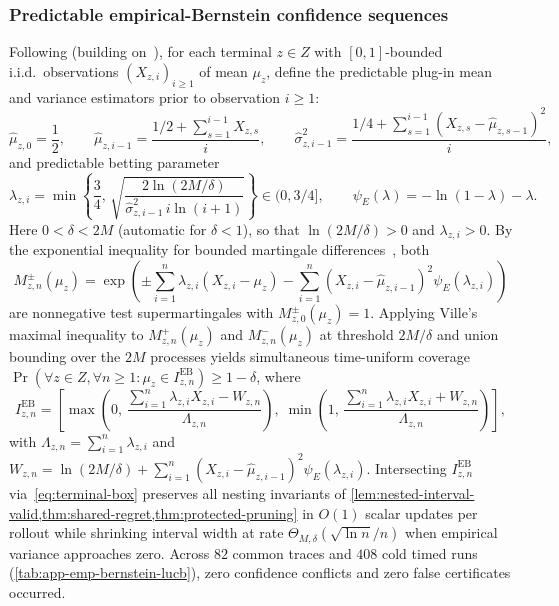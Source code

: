 \documentclass{article}
\theoremstyle{plain}
\theoremstyle{definition}
\begin{document}
\subsubsection{Predictable empirical-Bernstein confidence sequences}
\label{app:variance-cs}
Following \citet[Proposition~2]{bettingmeans} (building on~\citealp{maurer2009empirical,howard}), for each terminal $z\in Z$ with $[0,1]$-bounded i.i.d.\ observations $(X_{z,i})_{i\ge 1}$ of mean $\mu_z$, define the predictable plug-in mean and variance estimators prior to observation $i\ge 1$:
\begin{equation}
\widehat\mu_{z,0}=\frac{1}{2},\qquad
\widehat\mu_{z,i-1}=\frac{1/2+\sum_{s=1}^{i-1}X_{z,s}}{i},\qquad
\widehat\sigma_{z,i-1}^2=\frac{1/4+\sum_{s=1}^{i-1}(X_{z,s}-\widehat\mu_{z,s-1})^2}{i},
\end{equation}
and predictable betting parameter
\begin{equation}
\lambda_{z,i}=\min\!\left\{\frac{3}{4},\,\sqrt{\frac{2\ln(2M/\delta)}{\widehat\sigma_{z,i-1}^2\,i\ln(i+1)}}\right\}\in(0,3/4],
\qquad
\psi_E(\lambda)=-\ln(1-\lambda)-\lambda.
\end{equation}
Here $0<\delta<2M$ (automatic for $\delta<1$), so that $\ln(2M/\delta)>0$ and $\lambda_{z,i}>0$.
By the exponential inequality for bounded martingale differences~\citep{howard,bettingmeans}, both
\begin{equation}
M_{z,n}^\pm(\mu_z)=\exp\!\left(\pm\sum_{i=1}^n\lambda_{z,i}(X_{z,i}-\mu_z)-\sum_{i=1}^n(X_{z,i}-\widehat\mu_{z,i-1})^2\psi_E(\lambda_{z,i})\right)
\end{equation}
are nonnegative test supermartingales with $M_{z,0}^\pm(\mu_z)=1$. Applying Ville's maximal inequality to $M_{z,n}^+(\mu_z)$ and $M_{z,n}^-(\mu_z)$ at threshold $2M/\delta$ and union bounding over the $2M$ processes yields simultaneous time-uniform coverage $\Pr(\forall z\in Z,\forall n\ge 1:\mu_z\in I_{z,n}^{\mathrm{EB}})\ge 1-\delta$, where
\begin{equation}
I_{z,n}^{\mathrm{EB}}=\left[\max\!\left(0,\,\frac{\sum_{i=1}^n\lambda_{z,i}X_{z,i}-W_{z,n}}{\Lambda_{z,n}}\right),\;
\min\!\left(1,\,\frac{\sum_{i=1}^n\lambda_{z,i}X_{z,i}+W_{z,n}}{\Lambda_{z,n}}\right)\right],
\end{equation}
with $\Lambda_{z,n}=\sum_{i=1}^n\lambda_{z,i}$ and $W_{z,n}=\ln(2M/\delta)+\sum_{i=1}^n(X_{z,i}-\widehat\mu_{z,i-1})^2\psi_E(\lambda_{z,i})$. Intersecting $I_{z,n}^{\mathrm{EB}}$ via~\eqref{eq:terminal-box} preserves all nesting invariants of \cref{lem:nested-interval-valid,thm:shared-regret,thm:protected-pruning} in $O(1)$ scalar updates per rollout while shrinking interval width at rate $\Theta_{M,\delta}(\sqrt{\ln n}/n)$ when empirical variance approaches zero. Across $82$ common traces and $408$ cold timed runs (\cref{tab:app-emp-bernstein-lucb}), zero confidence conflicts and zero false certificates occurred.
\end{document}
